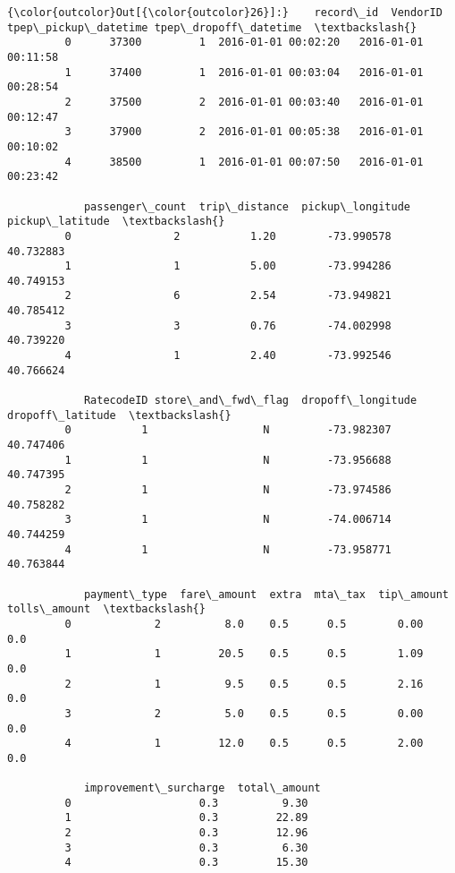 \documentclass[11pt]{article}
\begin{document}
\begin{Verbatim}[commandchars=\\\{\}]
{\color{outcolor}Out[{\color{outcolor}26}]:}    record\_id  VendorID tpep\_pickup\_datetime tpep\_dropoff\_datetime  \textbackslash{}
         0      37300         1  2016-01-01 00:02:20   2016-01-01 00:11:58   
         1      37400         1  2016-01-01 00:03:04   2016-01-01 00:28:54   
         2      37500         2  2016-01-01 00:03:40   2016-01-01 00:12:47   
         3      37900         2  2016-01-01 00:05:38   2016-01-01 00:10:02   
         4      38500         1  2016-01-01 00:07:50   2016-01-01 00:23:42   
         
            passenger\_count  trip\_distance  pickup\_longitude  pickup\_latitude  \textbackslash{}
         0                2           1.20        -73.990578        40.732883   
         1                1           5.00        -73.994286        40.749153   
         2                6           2.54        -73.949821        40.785412   
         3                3           0.76        -74.002998        40.739220   
         4                1           2.40        -73.992546        40.766624   
         
            RatecodeID store\_and\_fwd\_flag  dropoff\_longitude  dropoff\_latitude  \textbackslash{}
         0           1                  N         -73.982307         40.747406   
         1           1                  N         -73.956688         40.747395   
         2           1                  N         -73.974586         40.758282   
         3           1                  N         -74.006714         40.744259   
         4           1                  N         -73.958771         40.763844   
         
            payment\_type  fare\_amount  extra  mta\_tax  tip\_amount  tolls\_amount  \textbackslash{}
         0             2          8.0    0.5      0.5        0.00           0.0   
         1             1         20.5    0.5      0.5        1.09           0.0   
         2             1          9.5    0.5      0.5        2.16           0.0   
         3             2          5.0    0.5      0.5        0.00           0.0   
         4             1         12.0    0.5      0.5        2.00           0.0   
         
            improvement\_surcharge  total\_amount  
         0                    0.3          9.30  
         1                    0.3         22.89  
         2                    0.3         12.96  
         3                    0.3          6.30  
         4                    0.3         15.30  
\end{Verbatim}
            
\end{document}
